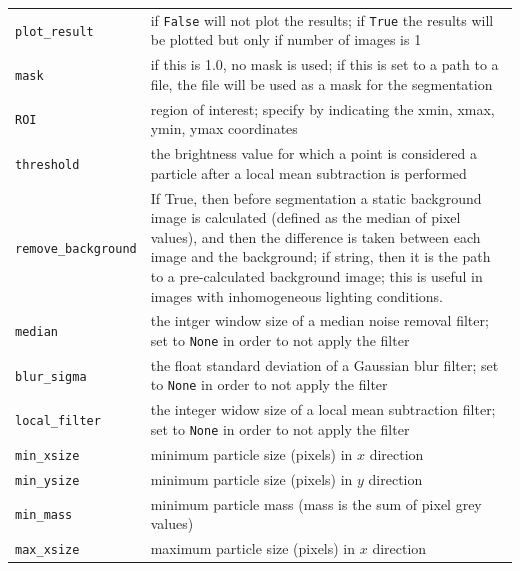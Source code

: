 \documentclass[10pt,a4paper]{article}
\begin{document}
\begin{table}[!ht]
\begin{tabular}{l m{13cm}}
		\texttt{plot\_result} & if \texttt{False} will not plot the results; if \texttt{True} the results will be plotted but only if number of images is 1 \\[.3em]
		
		\texttt{mask} & if this is 1.0, no mask is used; if this is set to a path to a file, the file will be used as a mask for the segmentation \\[.3em]
		
		
		\texttt{ROI} & region of interest; specify by indicating the xmin, xmax, ymin, ymax coordinates \\[.3em]
		
		\texttt{threshold} & the brightness value for which a point is considered a particle after a local mean subtraction is performed \\[.5em]
		
		\texttt{remove\_background} & If True, then before segmentation a static background image is calculated (defined as the median of pixel values), and then the difference is taken between each image and the background; if string, then it is the path to a pre-calculated background image; this is useful in images with inhomogeneous lighting conditions. \\[.5em]
		
		\texttt{median} & the intger window size of a median noise removal filter; set to \texttt{None} in order to not apply the filter \\[.3em]
		
		\texttt{blur\_sigma} & the float standard deviation of a Gaussian blur filter; set to \texttt{None} in order to not apply the filter \\[.3em]
		
		\texttt{local\_filter} & the integer widow size of a local mean subtraction filter; set to \texttt{None} in order to not apply the filter \\[.3em]
		
		\texttt{min\_xsize} & minimum particle size (pixels) in $x$ direction \\[.3em]
		
		\texttt{min\_ysize} & minimum particle size (pixels) in $y$ direction \\[.3em]
		
		\texttt{min\_mass} & minimum particle mass (mass is the sum of pixel grey values)\\[.3em]
		
		\texttt{max\_xsize} & maximum particle size (pixels) in $x$ direction \\[.3em]
		

\end{tabular}
\end{table}
\end{document}
